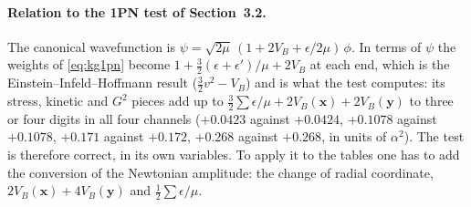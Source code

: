\documentclass[11pt]{article}
\newcommand{\bx}{\mathbf{x}}\newcommand{\by}{\mathbf{y}}
\begin{document}
\paragraph{Relation to the 1PN test of Section~3.2.} The canonical wavefunction is
$\psi=\sqrt{2\mu}\,(1+2V_B+\epsilon/2\mu)\,\phi$. In terms of $\psi$ the weights of \eqref{eq:kg1pn} become
$1+\tfrac32(\epsilon+\epsilon')/\mu+2V_B$ at each end, which is the Einstein--Infeld--Hoffmann result
($\tfrac32v^2-V_B$) and is what the test computes: its stress, kinetic and $G^2$ pieces add up to
$\tfrac32\sum\epsilon/\mu+2V_B(\bx)+2V_B(\by)$ to three or four digits in all four channels
($+0.0423$ against $+0.0424$, $+0.1078$ against $+0.1078$, $+0.171$ against $+0.172$, $+0.268$ against $+0.268$, in units of $\alpha^2$).
The test is therefore correct, in its own variables. To apply it to the tables one has to add the conversion of the Newtonian
amplitude: the change of radial coordinate, $2V_B(\bx)+4V_B(\by)$ and $\tfrac12\sum\epsilon/\mu$.
\end{document}
